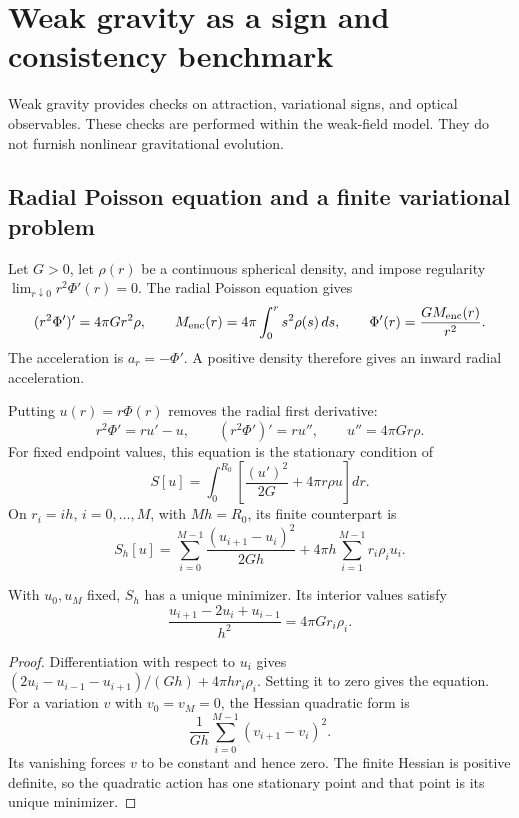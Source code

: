 \section{Weak gravity as a sign and consistency benchmark}
\label{c:core:weak-field}

Weak gravity provides checks on attraction, variational signs, and
optical observables. These checks are performed within the weak-field
model. They do not furnish nonlinear gravitational evolution.

\subsection{Radial Poisson equation and a finite variational problem}

Let $G>0$, let $\rho(r)$ be a continuous spherical density, and impose
regularity $\lim_{r\downarrow0}r^2\Phi'(r)=0$. The radial Poisson
equation gives
\[
 (r^2\Phi')'=4\pi G r^2\rho,
 \qquad M_{\rm enc}(r)=4\pi\int_0^rs^2\rho(s)\,ds,
 \qquad \Phi'(r)=\frac{GM_{\rm enc}(r)}{r^2}.
\]
The acceleration is $a_r=-\Phi'$. A positive density therefore gives
an inward radial acceleration.

Putting $u(r)=r\Phi(r)$ removes the radial first derivative:
\[
 r^2\Phi'=ru'-u,\qquad
 (r^2\Phi')'=ru'',\qquad u''=4\pi G r\rho.
\]
For fixed endpoint values, this equation is the stationary condition of
\[
 S[u]=\int_0^{R_0}\left[\frac{(u')^2}{2G}+4\pi r\rho u\right]dr.
\]
On $r_i=ih$, $i=0,\ldots,M$, with $Mh=R_0$, its finite counterpart is
\begin{equation}
 S_h[u]=\sum_{i=0}^{M-1}\frac{(u_{i+1}-u_i)^2}{2Gh}
 +4\pi h\sum_{i=1}^{M-1}r_i\rho_i u_i.
 \label{c:core:poisson-action}
\end{equation}

\begin{proposition}
\label{c:core:poisson-minimum}
With $u_0,u_M$ fixed, $S_h$ has a unique minimizer. Its interior values
satisfy
\[
 \frac{u_{i+1}-2u_i+u_{i-1}}{h^2}=4\pi G r_i\rho_i.
\]
\end{proposition}

\begin{proof}
Differentiation with respect to $u_i$ gives
$(2u_i-u_{i-1}-u_{i+1})/(Gh)+4\pi h r_i\rho_i$. Setting it to zero
gives the equation. For a variation $v$ with $v_0=v_M=0$, the Hessian
quadratic form is
\[
 \frac1{Gh}\sum_{i=0}^{M-1}(v_{i+1}-v_i)^2.
\]
Its vanishing forces $v$ to be constant and hence zero. The finite
Hessian is positive definite, so the quadratic action has one
stationary point and that point is its unique minimizer.
\end{proof}


